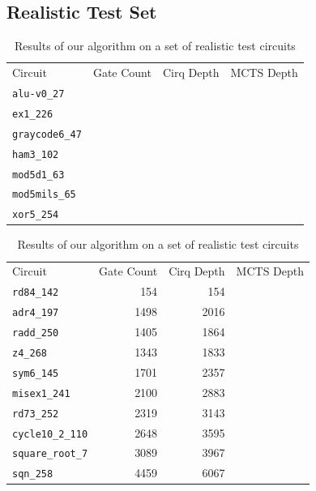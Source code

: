 \documentclass[%
 reprint,
 amsmath,amssymb,
 aps,
]{revtex4-2}
\begin{document}
\subsection{\label{sec:results-realistic}Realistic Test Set}

\begin{table}[H]
    \caption{\label{tab:small-circuits}%
        Results of our algorithm on a set of realistic test circuits
    }
    \begin{ruledtabular}
        \begin{tabular}{lrrr}
            \textrm{Circuit}       &
            \textrm{Gate Count}    &
            \textrm{Cirq Depth}    &
            \textrm{MCTS Depth}             \\
            \colrule

            \verb+alu-v0_27+ &   &  & \\
            \verb+ex1_226+ &   &  & \\
            \verb+graycode6_47+ &   &  & \\
            \verb+ham3_102+ &   &  & \\
            \verb+mod5d1_63+ &   &  & \\
            \verb+mod5mils_65+ &   &  & \\
            \verb+xor5_254+ &   &  & \\
        \end{tabular}
    \end{ruledtabular}
\end{table}


\begin{table}[H]
    \caption{\label{tab:large-circuits}%
        Results of our algorithm on a set of realistic test circuits
    }
    \begin{ruledtabular}
        \begin{tabular}{lrrr}
            \textrm{Circuit}        &
            \textrm{Gate Count}     &
            \textrm{Cirq Depth}     &
            \textrm{MCTS Depth}                     \\
            \colrule

            \verb+rd84_142+  & 154  & 154  & \\
            \verb+adr4_197+  & 1498 & 2016 & \\
            \verb+radd_250+ & 1405 & 1864 & \\
            \verb+z4_268+ & 1343 & 1833 & \\
            \verb+sym6_145+ & 1701 & 2357 & \\
            \verb+misex1_241+ & 2100 & 2883 & \\
            \verb+rd73_252+ & 2319 & 3143 & \\
            \verb+cycle10_2_110+ & 2648 & 3595 & \\
            \verb+square_root_7+ & 3089 & 3967 & \\
            \verb+sqn_258+ & 4459 & 6067 & \\
        \end{tabular}
    \end{ruledtabular}
\end{table}
\end{document}
